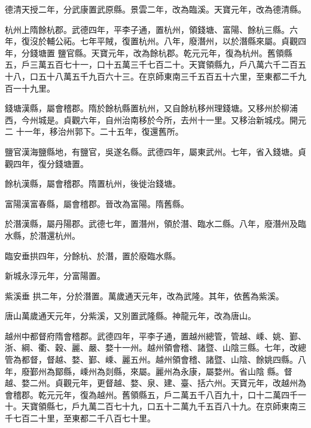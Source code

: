 \begin{pinyinscope}
 德清天授二年，分武康置武原縣。景雲二年，改為臨溪。天寶元年，改為德清縣。



 杭州上隋餘杭郡。武德四年，平李子通，置杭州，領錢塘、富陽、餘杭三縣。六年，復沒於輔公祏。七年平賊，復置杭州。八年，廢潛州，以於潛縣來屬。貞觀四年，分錢塘置
 鹽官縣。天寶元年，改為餘杭郡。乾元元年，復為杭州。舊領縣五，戶三萬五百七十一，口十五萬三千七百二十。天寶領縣九，戶八萬六千二百五十八，口五十八萬五千九百六十三。在京師東南三千五百五十六里，至東都二千九百一十九里。



 錢塘漢縣，屬會稽郡。隋於餘杭縣置杭州，又自餘杭移州理錢塘。又移州於柳浦西，今州城是。貞觀六年，自州治南移於今所，去州十一里。又移治新城戍。開元二
 十一年，移治州郭下。二十五年，復還舊所。



 鹽官漢海鹽縣地，有鹽官，吳遂名縣。武德四年，屬東武州。七年，省入錢塘。貞觀四年，復分錢塘置。



 餘杭漢縣，屬會稽郡。隋置杭州，後徙治錢塘。



 富陽漢富春縣，屬會稽郡。晉改為富陽。隋舊縣。



 於潛漢縣，屬丹陽郡。武德七年，置潛州，領於潛、臨水二縣。八年，廢潛州及臨水縣，於潛還杭州。



 臨安垂拱四年，分餘杭、於潛，置於廢臨水縣。



 新城永淳元年，分富陽置。



 紫溪垂
 拱二年，分於潛置。萬歲通天元年，改為武隆。其年，依舊為紫溪。



 唐山萬歲通天元年，分紫溪，又別置武隆縣。神龍元年，改為唐山。



 越州中都督府隋會稽郡。武德四年，平李子通，置越州總管，管越、嵊、姚、鄞、浙、綱、衢、穀、麗、嚴、婺十一州。越州領會稽、諸暨、山陰三縣。七年，改總管為都督，督越、婺、鄞、嵊、麗五州。越州領會稽、諸暨、山陰、餘姚四縣。八年，廢鄞州為鄮縣，嵊州為剡縣，來屬。麗州為永康，屬婺州。省山陰
 縣。督越、婺二州。貞觀元年，更督越、婺、泉、建、臺、括六州。天寶元年，改越州為會稽郡。乾元元年，復為越州。舊領縣五，戶二萬五千八百九十，口十二萬四千一十。天寶領縣七，戶九萬二百七十九，口五十二萬九千五百八十九。在京師東南三千七百二十里，至東都二千八百七十里。




\end{pinyinscope}
